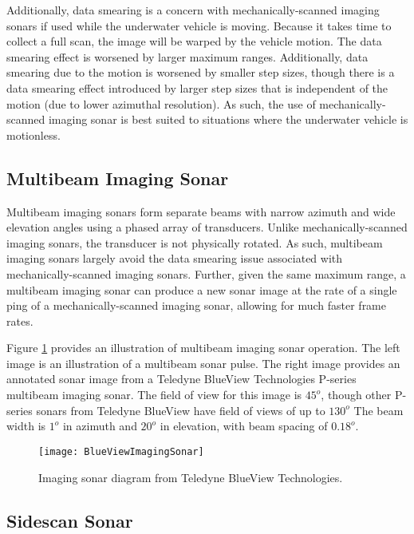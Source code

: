 Additionally, data smearing is a concern with mechanically-scanned imaging sonars if used while the underwater vehicle is moving. 
Because it takes time to collect a full scan, the image will be warped by the vehicle motion.  
The data smearing effect is worsened by larger maximum ranges.  
Additionally, data smearing due to the motion is worsened by smaller step sizes, though there is a data smearing effect introduced by larger step sizes that is independent of the motion (due to lower azimuthal resolution).
As such, the use of mechanically-scanned imaging sonar is best suited to situations where the underwater vehicle is motionless.

\subsection{Multibeam Imaging Sonar}
\label{sonar.Types.Multibeam}

Multibeam imaging sonars form separate beams with narrow azimuth and wide elevation angles using a phased array of transducers. 
Unlike mechanically-scanned imaging sonars, the transducer is not physically rotated.
As such, multibeam imaging sonars largely avoid the data smearing issue associated with mechanically-scanned imaging sonars.  
Further, given the same maximum range, a multibeam imaging sonar can produce a new sonar image at the rate of a single ping of a mechanically-scanned imaging sonar, allowing for much faster frame rates.

Figure \ref{fig:blueView} provides an illustration of multibeam imaging sonar operation.  The left image is an illustration of a multibeam sonar pulse.  The right image provides an annotated sonar image from a Teledyne BlueView Technologies P-series multibeam imaging sonar.  The field of view for this image is $45^{o}$, though other P-series sonars from Teledyne BlueView have field of views of up to $130^{o}$  The beam width is $1^{o}$ in azimuth and $20^{o}$ in elevation, with beam spacing of $0.18^{o}$. 

\begin{figure}[!h!]
	\centering
		\texttt{[image: BlueViewImagingSonar]}
	\caption{Imaging sonar diagram from Teledyne BlueView Technologies.}
	\label{fig:blueView}
\end{figure}

\subsection{Sidescan Sonar}
\label{sonar.Types.Sidescan}

